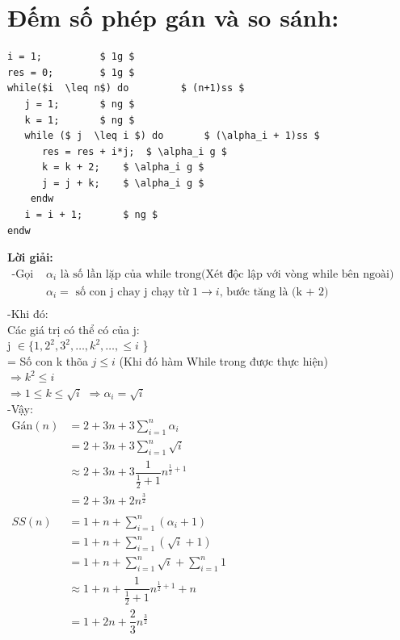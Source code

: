 \documentclass[12pt, letterpaper]{article}
\begin{document}
\section{Đếm số phép gán và so sánh:}
\begin{lstlisting}
i = 1;			$ 1g $
res = 0;		$ 1g $
while($i  \leq n$) do	      $ (n+1)ss $    
   j = 1;		$ ng $
   k = 1;		$ ng $
   while ($ j  \leq i $) do	      $ (\alpha_i + 1)ss $
      res = res + i*j;	$ \alpha_i g $
      k = k + 2;	$ \alpha_i g $
      j = j + k;	$ \alpha_i g $		
    endw
   i = i + 1;		$ ng $
endw
	\end{lstlisting}
	\textbf{Lời giải:} \\
	$ \begin{aligned}
		\text{-Gọi } & \alpha_i \text{ là số lần lặp của while trong(Xét độc lập với vòng while bên ngoài)} \\
					& \alpha_i = \text{ số con j chay j chạy từ 1} \rightarrow i \text{, bước tăng là (k + 2)} \\
	\end{aligned} $ \\
	-Khi đó:\\
	Các giá trị có thể có của j: \\
    j $\in \{ 1, 2^2, 3^2, \ldots, k^2, \ldots, \leq i$ \}\\
	= Số con k thõa $ j \leq i$ (Khi đó hàm While trong được thực hiện)\\ 
	$\Rightarrow k^2 \leq i$\\
	$\Rightarrow 1 \leq k \leq \sqrt{i}$
	$\Rightarrow \alpha_i = \sqrt{i}$\\
	-Vậy: \\
	$ \begin{aligned}
		\text{Gán}(n) & = 2 + 3n + 3\sum^{n}_{i = 1}\alpha_i\\
			& = 2 + 3n + 3\sum^{n}_{i = 1}\sqrt i\\
			& \approx 2 + 3n + 3 \dfrac{1}{\frac{1}{2} + 1} n^{\frac{1}{2} + 1} \\
			& = 2 + 3n + 2n^\frac{3}{2}\\
			\\SS(n) & = 1 + n + \sum^{n}_{i = 1}(\alpha_i + 1)\\
			& = 1 + n + \sum^{n}_{i = 1}(\sqrt i + 1)\\
			& = 1 + n + \sum^{n}_{i = 1}\sqrt i + \sum^{n}_{i = 1} 1 \\
			& \approx 1 + n + \dfrac{1}{\frac{1}{2} + 1} n^{\frac{1}{2} + 1} + n \\
			& = 1 + 2n + \dfrac{2}{3}n^\frac{3}{2}\\
	\end{aligned} $ \\
\end{document}
